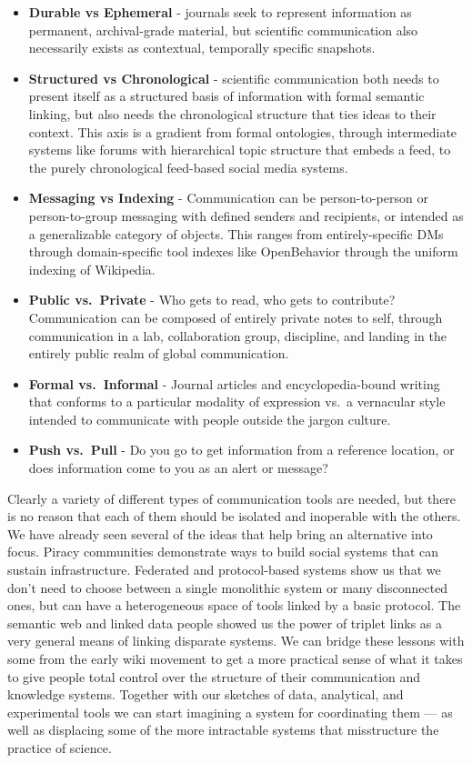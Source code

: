\documentclass[10pt]{article}
\begin{document}
\begin{multicols}{2}
\begin{itemize}
\item
  \textbf{Durable vs Ephemeral} - journals seek to represent information
  as permanent, archival-grade material, but scientific communication
  also necessarily exists as contextual, temporally specific snapshots.
\item
  \textbf{Structured vs Chronological} - scientific communication both
  needs to present itself as a structured basis of information with
  formal semantic linking, but also needs the chronological structure
  that ties ideas to their context. This axis is a gradient from formal
  ontologies, through intermediate systems like forums with hierarchical
  topic structure that embeds a feed, to the purely chronological
  feed-based social media systems.
\item
  \textbf{Messaging vs Indexing} - Communication can be person-to-person
  or person-to-group messaging with defined senders and recipients, or
  intended as a generalizable category of objects. This ranges from
  entirely-specific DMs through domain-specific tool indexes like
  OpenBehavior through the uniform indexing of Wikipedia.
\item
  \textbf{Public vs.~Private} - Who gets to read, who gets to
  contribute? Communication can be composed of entirely private notes to
  self, through communication in a lab, collaboration group, discipline,
  and landing in the entirely public realm of global communication.
\item
  \textbf{Formal vs.~Informal} - Journal articles and encyclopedia-bound
  writing that conforms to a particular modality of expression vs.~a
  vernacular style intended to communicate with people outside the
  jargon culture.
\item
  \textbf{Push vs.~Pull} - Do you go to get information from a reference
  location, or does information come to you as an alert or message?
\end{itemize}

Clearly a variety of different types of communication tools are needed,
but there is no reason that each of them should be isolated and
inoperable with the others. We have already seen several of the ideas
that help bring an alternative into focus. Piracy communities
demonstrate ways to build social systems that can sustain
infrastructure. Federated and protocol-based systems show us that we
don't need to choose between a single monolithic system or many
disconnected ones, but can have a heterogeneous space of tools linked by
a basic protocol. The semantic web and linked data people showed us the
power of triplet links as a very general means of linking disparate
systems. We can bridge these lessons with some from the early wiki
movement to get a more practical sense of what it takes to give people
total control over the structure of their communication and knowledge
systems. Together with our sketches of data, analytical, and
experimental tools we can start imagining a system for coordinating them
--- as well as displacing some of the more intractable systems that
misstructure the practice of science. 
\end{multicols}
\end{document}
